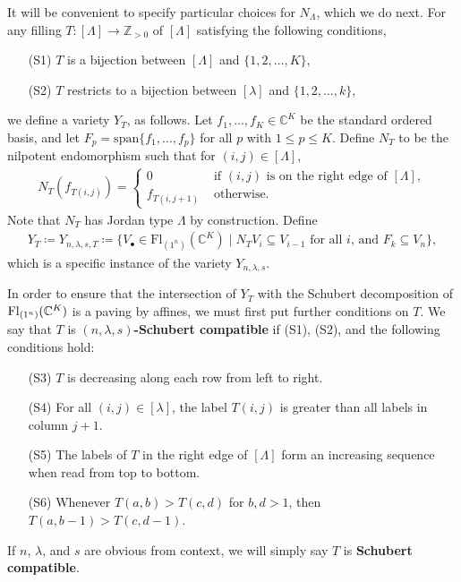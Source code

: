 \documentclass[11pt]{amsart}
\theoremstyle{definition}
\newcommand{\vspan}{\mathrm{span}}
\newcommand{\Fl}{\mathrm{Fl}}
\newcommand{\la}{\lambda}
\begin{document}
It will be convenient to specify particular choices for $N_\Lambda$, which we do next. For any filling $T:[\Lambda]\rightarrow \mathbb{Z}_{>0}$ of $[\Lambda]$ satisfying the following conditions,
\begin{enumerate}
\item[(S1)] $T$ is a bijection between $[\Lambda]$ and $\{1,2,\dots, K\}$,
\item[(S2)] $T$ restricts to a bijection between $[\lambda]$ and $\{1, 2, \ldots, k\}$,
\end{enumerate}
we define a variety $Y_{T}$, as follows.
Let $f_1,\ldots,f_K\in \mathbb{C}^K$ be the standard ordered basis, and let $F_p=\vspan\{f_1,\ldots,f_p\}$ for all $p$ with $1\leq p\leq K$. Define $N_T$ to be the nilpotent endomorphism such that for $(i,j)\in [\Lambda]$,
\begin{align}
N_T(f_{T(i,j)}) = 
\begin{cases} 
0 & \text{ if }(i,j)\text{ is on the right edge of }[\Lambda],\\
f_{T(i,j+1)} & \text{ otherwise.}
\end{cases}
\end{align}
Note that $N_T$ has Jordan type
$\Lambda$ by construction.  
Define
\begin{align}
    Y_T \coloneqq Y_{n,\lambda,s,T}\coloneqq \{V_\bullet\in\Fl_{(1^n)}(\mathbb{C}^K) \mid N_TV_i\subseteq V_{i-1}\text{ for all } i\text{, and } F_k\subseteq V_n\},
\end{align}
which is a specific instance of the variety $Y_{n,\la,s}$.

In order to ensure that the intersection of $Y_{T}$ with the Schubert decomposition of $\Fl_{(1^n)}(\bC^K)$ is a paving by affines,
we must first put further conditions on $T$. 
We say that $T$ is {\bf $(n,\lambda,s)$-Schubert compatible} if (S1), (S2), and the following conditions hold:
\begin{enumerate}
\item[(S3)] $T$ is decreasing along each row from left to right.
\item[(S4)] For all $(i,j)\in [\lambda]$, the label $T(i,j)$ is greater than all labels in column $j+1$.
\item[(S5)] The labels of $T$ in the right edge of $[\Lambda]$ form an increasing sequence when read from top to bottom.
\item[(S6)] Whenever $T(a,b)>T(c,d)$ for $b,d>1$, then $T(a,b-1)>T(c,d-1)$.
\end{enumerate}
If $n$, $\lambda$, and $s$ are obvious from context, we will simply say $T$ is {\bf Schubert compatible}.
\end{document}
